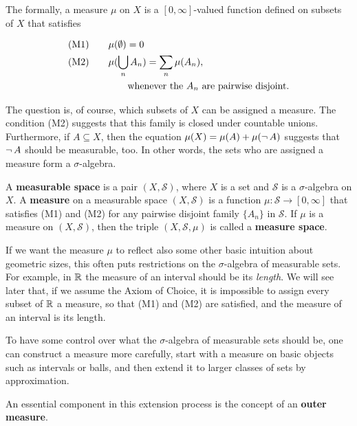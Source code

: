 The formally, a measure $\mu$ on $X$ is a $[0,\infty]$-valued function defined on subsets of $X$ that satisfies

\begin{align*}
    (\operatorname{M1}) & \qquad \mu(\emptyset) = 0 \\
    (\operatorname{M2}) & \qquad \mu(\bigcup_n A_n) = \sum_n \mu(A_n), \\
              & \qquad \qquad \text{whenever the $A_n$ are pairwise disjoint.}
\end{align*}

The question is, of course, which subsets of $X$ can be assigned a measure. The condition (M2) suggests that this family is closed under countable unions. Furthermore, if $A \subseteq X$, then the equation $\mu(X) = \mu(A) + \mu(\neg \, A)$ suggests that $\neg \, A$ should be measurable, too. In other words, the sets who are assigned a measure form a $\sigma$-algebra.

\begin{definition}\label{def-measure}A \textbf{measurable space} is a pair $(X, \mathcal{S})$, where $X$ is a set and $\mathcal{S}$ is a $\sigma$-algebra on $X$. A \textbf{measure} on a measurable space $(X, \mathcal{S})$ is a function $\mu: \mathcal{S} \to [0,\infty]$ that satisfies (M1) and (M2) for any pairwise disjoint family $\{A_n\}$ in $\mathcal{S}$. If $\mu$ is a measure on $(X, \mathcal{S})$, then the triple $(X,\mathcal{S}, \mu)$ is called a \textbf{measure space}.

\end{definition}If we want the measure $\mu$ to reflect also some other basic intuition about geometric sizes, this often puts restrictions on the $\sigma$-algebra of measurable sets. For example, in $\mathbb{R}$ the measure of an interval should be its \textit{length}. We will see later that, if we assume the Axiom of Choice, it is impossible to assign every subset of $\mathbb{R}$ a measure, so that (M1) and (M2) are satisfied, and the measure of an interval is its length.

To have some control over what the $\sigma$-algebra of measurable sets should be, one can construct a measure more carefully, start with a measure on basic objects such as intervals or balls, and then extend it to larger classes of sets by approximation.

An essential component in this extension process is the concept of an \textbf{outer measure}.

